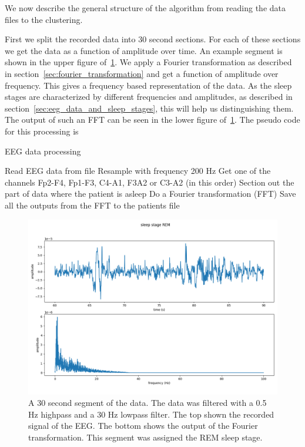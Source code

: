 We now describe the general structure of the algorithm from reading the data files to the clustering.

First we split the recorded data into 30 second sections. For each of these sections we get the data as a function of amplitude over time. An example segment is shown in the upper figure of~\ref{fig:example_30s_segment}. We apply a Fourier transformation as described in section~\ref{sec:fourier_transformation} and get a function of amplitude over frequency. This gives a frequency based representation of the data. As the sleep stages are characterized by different frequencies and amplitudes, as described in section~\ref{sec:eeg_data_and_sleep_stages}, this will help us distinguishing them. The output of such an FFT can be seen in the lower figure of~\ref{fig:example_30s_segment}. The pseudo code for this processing is 

\begin{algorithm}
	\caption{EEG data processing}\label{alg:process_eeg_data}
	\begin{algorithmic}
		\State Read EEG data from file
		\State Resample with frequency 200 Hz
		\State Get one of the channels Fp2-F4, Fp1-F3, C4-A1, F3A2 or C3-A2 (in this order)
		\State Section out the part of data where the patient is asleep
		\State Do a Fourier transformation (FFT)
		\EndFor
		\State Save all the outputs from the FFT to the patients file
		\EndFor
	\end{algorithmic}
\end{algorithm}


\begin{figure}
	\centering
	\includegraphics[width=\linewidth]{figs/example_30s_segment}
	\caption{A 30 second segment of the data. The data was filtered with a 0.5 Hz highpass and a 30 Hz lowpass filter. The top shown the recorded signal of the EEG. The bottom shows the output of the Fourier transformation. This segment was assigned the REM sleep stage.}
	\label{fig:example_30s_segment}
\end{figure}


